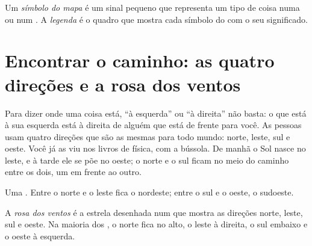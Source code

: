 \begin{definition}[Legenda]\label{def:g2:drawing-to-map:legend}
Um \emph{símbolo do mapa} é um sinal pequeno que representa um
tipo de coisa numa  ou num . A \emph{legenda} é o quadro
que mostra cada símbolo do  com o seu significado.
\end{definition}

\section{Encontrar o caminho: as quatro direções e a rosa dos ventos}

Para dizer onde uma coisa está, ``à esquerda'' ou ``à direita'' não
basta: o que está à sua esquerda está à direita de alguém que está de
frente para você. As pessoas usam quatro direções que são as mesmas para
todo mundo: norte, leste, sul e oeste. Você já as viu nos livros de física,
com a bússola. De manhã o Sol nasce no leste, e à tarde ele se põe no oeste;
o norte e o sul ficam no meio do caminho entre os dois, um em frente ao outro.

\begin{omfigure}

{\small Uma . Entre o norte e o leste fica o nordeste; entre o
sul e o oeste, o sudoeste.}
\label{fig:g2:drawing-to-map:rose}
\end{omfigure}

\begin{definition}\label{def:g2:drawing-to-map:directions}
A \emph{rosa dos ventos} é a estrela desenhada num 
que mostra as direções norte, leste, sul e oeste. Na maioria dos , o
norte fica no alto, o leste à direita, o sul embaixo e o oeste à esquerda.
\end{definition}

